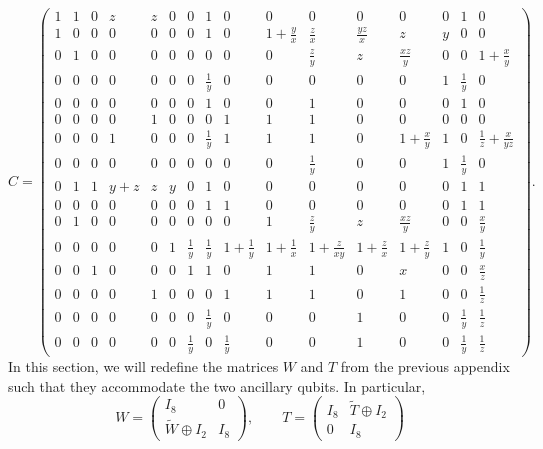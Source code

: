 \documentclass[prx,twocolumn,superscriptaddress,nofootinbib,showpacs,notitlepage]{revtex4-2}
\begin{document}
\begin{equation}
    C=\begin{pmatrix}
    1 & 1 & 0 & z & z & 0 & 0 & 1 & 0 & 0 & 0 & 0 & 0 & 0 & 1 & 0 \\
    1 & 0 & 0 & 0 & 0 & 0 & 0 & 1 & 0 & 1+\frac{y}{x} & \frac{z}{x} & \frac{yz}{x} & z & y & 0 & 0 \\
    0 & 1 & 0 & 0 & 0 & 0 & 0 & 0 & 0 & 0 & \frac{z}{y} & z & \frac{xz}{y} & 0 & 0 & 1+\frac{x}{y} \\
    0 & 0 & 0 & 0 & 0 & 0 & 0 & \frac{1}{y} & 0 & 0 & 0 & 0 & 0 & 1 & \frac{1}{y} & 0 \\
    0 & 0 & 0 & 0 & 0 & 0 & 0 & 1 & 0 & 0 & 1 & 0 & 0 & 0 & 1 & 0 \\
    0 & 0 & 0 & 0 & 1 & 0 & 0 & 0 & 1 & 1 & 1 & 0 & 0 & 0 & 0 & 0 \\
    0 & 0 & 0 & 1 & 0 & 0 & 0 & \frac{1}{y} & 1 & 1 & 1 & 0 & 1+\frac{x}{y} & 1 & 0 & \frac{1}{z}+\frac{x}{yz} \\
    0 & 0 & 0 & 0 & 0 & 0 & 0 & 0 & 0 & 0 & \frac{1}{y} & 0 & 0 & 1 & \frac{1}{y} & 0 \\
    0 & 1 & 1 & y+z & z & y & 0 & 1 & 0 & 0 & 0 & 0 & 0 & 0 & 1 & 1 \\
    0 & 0 & 0 & 0 & 0 & 0 & 0 & 1 & 1 & 0 & 0 & 0 & 0 & 0 & 1 & 1 \\
    0 & 1 & 0 & 0 & 0 & 0 & 0 & 0 & 0 & 1 & \frac{z}{y} & z & \frac{xz}{y} & 0 & 0 & \frac{x}{y} \\
    0 & 0 & 0 & 0 & 0 & 1 & \frac{1}{y} & \frac{1}{y} & 1+\frac{1}{y} & 1+\frac{1}{x} & 1+\frac{z}{xy} & 1+\frac{z}{x} & 1+\frac{z}{y} & 1 & 0 & \frac{1}{y} \\
    0 & 0 & 1 & 0 & 0 & 0 & 1 & 1 & 0 & 1 & 1 & 0 & x & 0 & 0 & \frac{x}{z} \\
    0 & 0 & 0 & 0 & 1 & 0 & 0 & 0 & 1 & 1 & 1 & 0 & 1 & 0 & 0 & \frac{1}{z} \\
    0 & 0 & 0 & 0 & 0 & 0 & 0 & \frac{1}{y} & 0 & 0 & 0 & 1 & 0 & 0 & \frac{1}{y} & \frac{1}{z} \\
    0 & 0 & 0 & 0 & 0 & 0 & \frac{1}{y} & 0 & \frac{1}{y} & 0 & 0 & 1 & 0 & 0 & \frac{1}{y} & \frac{1}{z} 
    \end{pmatrix}.
\end{equation}
In this section, we will redefine the matrices $W$ and $T$ from the previous appendix such that they accommodate the two ancillary qubits. In particular,
\begin{equation}
    W=\begin{pmatrix}
    I_8&0\\ \widetilde{W}\oplus I_2&I_8
    \end{pmatrix},\qquad
    T=\begin{pmatrix}
    I_8&\widetilde{T}\oplus I_2\\0&I_8
    \end{pmatrix}
\end{equation}
\end{document}
